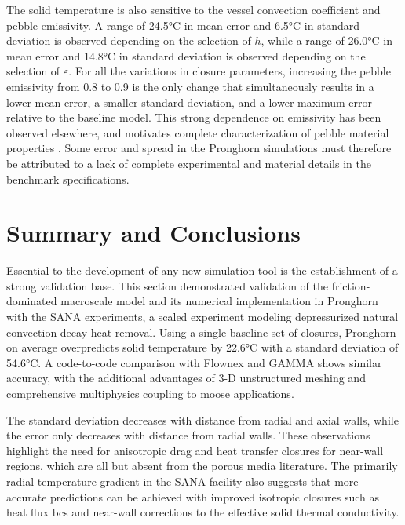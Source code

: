 The solid temperature is also sensitive to the vessel convection coefficient and pebble emissivity. A range of 24.5\si{\celsius} in mean error and 6.5\si{\celsius} in standard deviation is observed depending on the selection of \(h\), while a range of 26.0\si{\celsius} in mean error and 14.8\si{\celsius} in standard deviation is observed depending on the selection of \(\varepsilon\). For all the variations in closure parameters, increasing the pebble emissivity from 0.8 to 0.9 is the only change that simultaneously results in a lower mean error, a smaller standard deviation, and a lower maximum error relative to the baseline model. This strong dependence on emissivity has been observed elsewhere, and motivates complete characterization of pebble material properties \cite{tecdoc1163}. Some error and spread in the Pronghorn simulations must therefore be attributed to a lack of complete experimental and material details in the benchmark specifications.

\section{Summary and Conclusions}
\label{sec:5_summary}

Essential to the development of any new simulation tool is the establishment of a strong validation base. This section demonstrated validation of the friction-dominated macroscale model and its numerical implementation in Pronghorn with the SANA experiments, a scaled experiment modeling depressurized natural convection decay heat removal. Using a single baseline set of closures, Pronghorn on average overpredicts solid temperature by 22.6\si{\celsius} with a standard deviation of 54.6\si{\celsius}. A code-to-code comparison with Flownex and GAMMA shows similar accuracy, with the additional advantages of 3-D unstructured meshing and comprehensive multiphysics coupling to \gls{moose} applications. 

The standard deviation decreases with distance from radial and axial walls, while the error only decreases with distance from radial walls. These observations highlight the need for anisotropic drag and heat transfer closures for near-wall regions, which are all but absent from the porous media literature. The primarily radial temperature gradient in the SANA facility also suggests that more accurate predictions can be achieved with improved isotropic closures such as heat flux \glspl{bc} and near-wall corrections to the effective solid thermal conductivity. 

